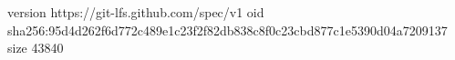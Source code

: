 version https://git-lfs.github.com/spec/v1
oid sha256:95d4d262f6d772c489e1c23f2f82db838c8f0c23cbd877c1e5390d04a7209137
size 43840

